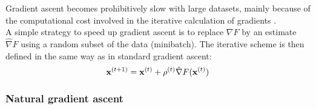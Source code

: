 Gradient ascent becomes prohibitively slow with large datasets, mainly because of the computational cost involved in the iterative calculation of gradients \cite{Spall2003}.\\
A simple strategy to speed up gradient ascent is to replace $\nabla F$ by an estimate $\hat{\nabla} F$ using a random subset of the data (minibatch).
The iterative scheme is then defined in the same way as in standard gradient ascent:
\begin{equation}
	{\bf x}^{(t+1)} = {\bf x}^{(t)} + \rho^{(t)} \hat{\nabla} F({\bf x}^{(t)})
\end{equation}




\subsubsection{Natural gradient ascent} \label{section:natural_gradient_ascent}

